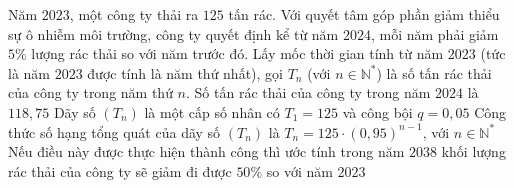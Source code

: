 \begin{ex}%
	Năm $2023$, một công ty thải ra $125$ tấn rác. Với quyết tâm góp phần giảm thiểu sự ô nhiễm môi trường, công ty quyết định kể từ năm $2024$, mỗi năm phải giảm $5\%$ lượng rác thải so với năm trước đó. Lấy mốc thời gian tính từ năm $2023$ (tức là năm $2023$ được tính là năm thứ nhất), gọi $T_n$ (với $n\in \mathbb{N}^*$) là số tấn rác thải của công ty trong năm thứ $n$.
	\choiceTF
	{\True Số tấn rác thải của công ty trong năm $2024$ là $118{,}75$}
	{Dãy số $(T_n)$ là một cấp số nhân có $T_1=125$ và công bội $q=0{,}05$}
	{\True Công thức số hạng tổng quát của dãy số $(T_n)$ là $T_n=125\cdot(0{,}95)^{n-1}$, với $n\in \mathbb{N}^*$}
	{Nếu điều này được thực hiện thành công thì ước tính trong năm $2038$ khối lượng rác thải của công ty sẽ giảm đi được $50\%$ so với năm $2023$}
\end{ex}

